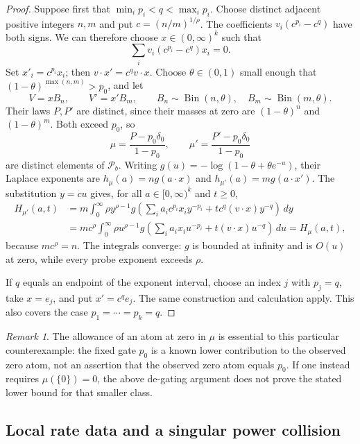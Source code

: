 \documentclass[11pt,letterpaper]{article}
\theoremstyle{definition}
\theoremstyle{remark}
\newtheorem{remark}[theorem]{Remark}
\newcommand{\1}{\mathbf 1}
\begin{document}
\begin{proof}
Suppose first that $\min_i p_i<q<\max_i p_i$.
Choose distinct adjacent positive integers $n,m$ and put
$c=(n/m)^{1/\rho}$. The coefficients
$v_i(c^{p_i}-c^q)$ have both signs. We can therefore choose
$x\in(0,\infty)^k$ such that
\[
 \sum_i v_i(c^{p_i}-c^q)x_i=0.
\]
Set $x'_i=c^{p_i}x_i$; then $v\cdot x'=c^q v\cdot x$.
Choose $\theta\in(0,1)$ small enough that
$(1-\theta)^{\max(n,m)}>p_0$, and let
\[
 V=xB_n,\qquad V'=x'B_m,
 \qquad B_n\sim\operatorname{Bin}(n,\theta),\quad
 B_m\sim\operatorname{Bin}(m,\theta).
\]
Their laws $P,P'$ are distinct, since their masses at zero are
$(1-\theta)^n$ and $(1-\theta)^m$. Both exceed $p_0$, so
\[
 \mu=\frac{P-p_0\delta_0}{1-p_0},\qquad
 \mu'=\frac{P'-p_0\delta_0}{1-p_0}
\]
are distinct elements of $\mathcal P_b$.
Writing $g(u)=-\log(1-\theta+\theta e^{-u})$, their Laplace exponents
are $h_\mu(a)=ng(a\cdot x)$ and
$h_{\mu'}(a)=mg(a\cdot x')$. The substitution $y=cu$ gives,
for all $a\in[0,\infty)^k$ and $t\ge0$,
\[
\begin{split}
 H_{\mu'}(a,t)
 &=m\int_0^\infty\rho y^{\rho-1}
 g\left(\sum_i a_i c^{p_i}x_i y^{-p_i}
       +t c^q(v\cdot x)y^{-q}\right)\,dy\\
 &=mc^\rho\int_0^\infty\rho u^{\rho-1}
 g\left(\sum_i a_i x_i u^{-p_i}
       +t(v\cdot x)u^{-q}\right)\,du
 =H_\mu(a,t),
\end{split}
\]
because $mc^\rho=n$. The integrals converge: $g$ is bounded at infinity
and is $O(u)$ at zero, while every probe exponent exceeds $\rho$.

If $q$ equals an endpoint of the exponent interval, choose an index $j$
with $p_j=q$, take $x=e_j$, and put $x'=c^q e_j$.
The same construction and calculation apply. This also covers the case
$p_1=\cdots=p_k=q$.
\end{proof}

\begin{remark}
The allowance of an atom at zero in $\mu$ is essential to this particular
counterexample: the fixed gate $p_0$ is a known lower contribution to the
observed zero atom, not an assertion that the observed zero atom equals
$p_0$. If one instead requires $\mu(\{0\})=0$, the above de-gating
argument does not prove the stated lower bound for that smaller class.
\end{remark}

\subsection{Local rate data and a singular power collision}
\end{document}
